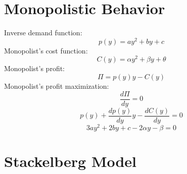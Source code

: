 \documentclass[11pt, a4paper]{article}
\begin{document}
\section{Monopolistic Behavior}

Inverse demand function:
\begin{equation*}
	p(y) = ay^2 + by  + c
\end{equation*}
Monopolist's cost function:
\begin{equation*} 
	C(y) = \alpha y^2 + \beta y + \theta
\end{equation*}
Monopolist's profit:
\begin{equation*}
	\Pi = p(y)y - C(y)
\end{equation*}
Monopolist's profit maximization:
\begin{equation*}
	\frac{d\Pi}{dy} = 0
\end{equation*}
\begin{equation*}
	p(y) + \frac{dp(y)}{dy}y - \frac{dC(y)}{dy} = 0
\end{equation*}
\begin{equation*}
	3ay^2 + 2by + c - 2\alpha y - \beta= 0
\end{equation*}

\section{Stackelberg Model}
\end{document}
